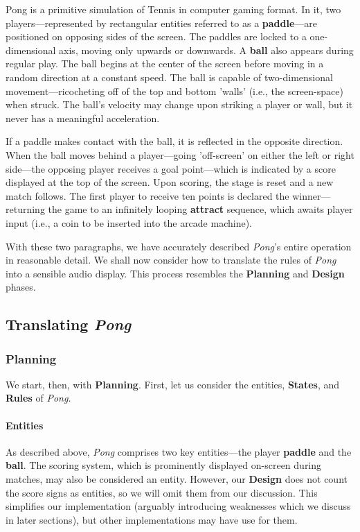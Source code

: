 \documentclass{report}
\newcommand{\plan}{\textbf{Planning}\xspace}
\newcommand{\design}{\textbf{Design}\xspace}
\newcommand{\state}[1]{\textbf{#1}}
\newcommand{\rules}{\textbf{Rules}\xspace}
\newcommand{\pad}{\textbf{paddle}\xspace}
\newcommand{\ball}{\textbf{ball}\xspace}
\newcommand{\tech}[1]{\textbf{#1}}
\begin{document}
Pong is a primitive simulation of Tennis in computer gaming format. In it, two players---represented by rectangular entities referred to as a \tech{paddle}---are positioned on opposing sides of the screen. The paddles are locked to a one-dimensional axis, moving only upwards or downwards. A \tech{ball} also appears during regular play. The ball begins at the center of the screen before moving in a random direction at a constant speed. The ball is capable of two-dimensional movement---ricocheting off of the top and bottom 'walls' (i.e., the screen-space) when struck. The ball's velocity may change upon striking a player or wall, but it never has a meaningful acceleration.

If a paddle makes contact with the ball, it is reflected in the opposite direction. When the ball moves behind a player---going 'off-screen' on either the left or right side---the opposing player receives a goal point---which is indicated by a score displayed at the top of the screen. Upon scoring, the stage is reset and a new match follows. The first player to receive ten points is declared the winner---returning the game to an infinitely looping \state{attract} sequence, which awaits player input (i.e., a coin to be inserted into the arcade machine).

With these two paragraphs, we have accurately described \emph{Pong}'s entire operation in reasonable detail. We shall now consider how to translate the rules of \emph{Pong} into a sensible audio display. This process resembles the \plan and \design phases.

\subsection{Translating \emph{Pong}}
\subsubsection{Planning}
We start, then, with \plan. First, let us consider the entities, \state{States}, and \rules of \emph{Pong.}

\paragraph{Entities}

As described above, \emph{Pong} comprises two key entities---the player \pad and the \ball.
The scoring system, which is prominently displayed on-screen during matches, may also be considered an entity. However, our \design does not count the score signs as entities, so we will omit them from our discussion. This simplifies our implementation (arguably introducing weaknesses which we discuss in later sections), but other implementations may have use for them. 
\end{document}
